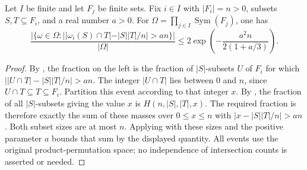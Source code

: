 \begin{lemma}
Let $I$ be finite and let $F_j$ be finite sets. Fix $i\in I$ with
$|F_i|=n>0$, subsets $S,T\subseteq F_i$, and a real number $a>0$.
For $\Omega=\prod_{j\in I}\operatorname{Sym}(F_j)$, one has
\[
\frac{|\{\omega\in\Omega:
 \bigl||\omega_i(S)\cap T|-|S||T|/n\bigr|>an\}|}{|\Omega|}
\leq 2\exp\!\left(-\frac{a^2n}{2(1+a/3)}\right).
\]
\end{lemma}
\begin{proof}
By , the fraction on the left is
the fraction of $|S|$-subsets $U$ of $F_i$ for which
$\bigl||U\cap T|-|S||T|/n\bigr|>an$.
The integer $|U\cap T|$ lies between $0$ and $n$, since
$U\cap T\subseteq T\subseteq F_i$. Partition this event according
to that integer $x$. By ,
the fraction of all $|S|$-subsets giving the value $x$ is
$H(n,|S|,|T|,x)$. The required fraction is therefore exactly the sum
of these masses over $0\leq x\leq n$ with
$|x-|S||T|/n|>an$. Both subset sizes are at most $n$.
Applying  with these sizes and the
positive parameter $a$ bounds that sum by the displayed quantity.
All events use the original product-permutation space; no independence
of intersection counts is asserted or needed.
\end{proof}
